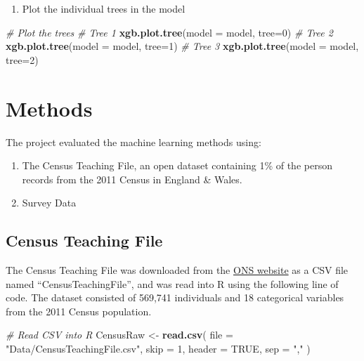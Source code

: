 \documentclass[]{book}
\newenvironment{Shaded}{\begin{snugshade}}{\end{snugshade}}
\newcommand{\KeywordTok}[1]{\textcolor[rgb]{0.13,0.29,0.53}{\textbf{#1}}}
\newcommand{\DataTypeTok}[1]{\textcolor[rgb]{0.13,0.29,0.53}{#1}}
\newcommand{\DecValTok}[1]{\textcolor[rgb]{0.00,0.00,0.81}{#1}}
\newcommand{\StringTok}[1]{\textcolor[rgb]{0.31,0.60,0.02}{#1}}
\newcommand{\CommentTok}[1]{\textcolor[rgb]{0.56,0.35,0.01}{\textit{#1}}}
\newcommand{\OtherTok}[1]{\textcolor[rgb]{0.56,0.35,0.01}{#1}}
\newcommand{\NormalTok}[1]{#1}
\providecommand{\tightlist}{%
  \setlength{\itemsep}{0pt}\setlength{\parskip}{0pt}}
\begin{document}
\begin{enumerate}
\def\labelenumi{\arabic{enumi})}
\setcounter{enumi}{7}
\tightlist
\item
  Plot the individual trees in the model
\end{enumerate}

\begin{Shaded}
\begin{Highlighting}[]
\CommentTok{# Plot the trees}
\CommentTok{# Tree 1}
\KeywordTok{xgb.plot.tree}\NormalTok{(}\DataTypeTok{model =}\NormalTok{ model, }\DataTypeTok{tree=}\DecValTok{0}\NormalTok{)}
\CommentTok{# Tree 2}
\KeywordTok{xgb.plot.tree}\NormalTok{(}\DataTypeTok{model =}\NormalTok{ model, }\DataTypeTok{tree=}\DecValTok{1}\NormalTok{)}
\CommentTok{# Tree 3}
\KeywordTok{xgb.plot.tree}\NormalTok{(}\DataTypeTok{model =}\NormalTok{ model, }\DataTypeTok{tree=}\DecValTok{2}\NormalTok{)}
\end{Highlighting}
\end{Shaded}

\chapter{Methods}\label{methods-1}

The project evaluated the machine learning methods using:

\begin{enumerate}
\def\labelenumi{\arabic{enumi})}
\tightlist
\item
  The Census Teaching File, an open dataset containing 1\% of the person
  records from the 2011 Census in England \& Wales.\\
\item
  Survey Data
\end{enumerate}

\section{Census Teaching File}\label{census-teaching-file}

The Census Teaching File was downloaded from the
\href{https://www.ons.gov.uk/census/2011census/2011censusdata/censusmicrodata/microdatateachingfile}{ONS
website} as a CSV file named ``CensusTeachingFile'', and was read into R
using the following line of code. The dataset consisted of 569,741
individuals and 18 categorical variables from the 2011 Census
population.

\begin{Shaded}
\begin{Highlighting}[]
\CommentTok{# Read CSV into R}
\NormalTok{CensusRaw <-}\StringTok{ }\KeywordTok{read.csv}\NormalTok{(}
  \DataTypeTok{file =} \StringTok{"Data/CensusTeachingFile.csv"}\NormalTok{, }\DataTypeTok{skip =} \DecValTok{1}\NormalTok{,}
  \DataTypeTok{header =} \OtherTok{TRUE}\NormalTok{, }\DataTypeTok{sep =} \StringTok{","}
\NormalTok{)}
\end{Highlighting}
\end{Shaded}
\end{document}
